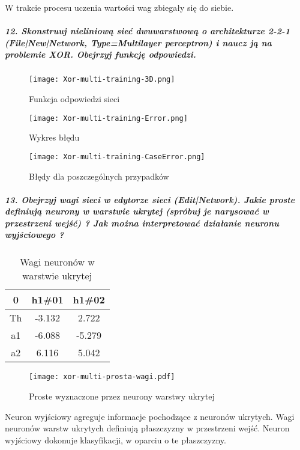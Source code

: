 \documentclass{article}
\begin{document}
W trakcie procesu uczenia wartości wag zbiegały się do siebie. 

\subparagraph{12. Skonstruuj nieliniową sieć dwuwarstwową o architekturze 2-2-1 (File|New|Network, Type=Multilayer perceptron) i naucz ją na problemie XOR. Obejrzyj funkcję odpowiedzi.\\}

\begin{figure}[H]
\begin{center}
\texttt{[image: Xor-multi-training-3D.png]}
\end{center}
\caption{Funkcja odpowiedzi sieci}
\label{fig-1Tdelta}
\end{figure}

\begin{figure}[H]
\begin{center}
\texttt{[image: Xor-multi-training-Error.png]}
\end{center}
\caption{Wykres błędu}
\label{fig-1Tdelta}
\end{figure}

\begin{figure}[H]
\begin{center}
\texttt{[image: Xor-multi-training-CaseError.png]}
\end{center}
\caption{Błędy dla poszczególnych przypadków}
\label{fig-1Tdelta}
\end{figure}

\subparagraph{13. Obejrzyj wagi sieci w edytorze sieci (Edit|Network). Jakie proste definiują neurony w warstwie ukrytej (spróbuj je narysować w przestrzeni wejść) ? Jak można interpretować działanie neuronu wyjściowego ?\\}
\begin{table}[h]
    \begin{tabular}{|c|c|c|}
     \hline
        0 & h1\#01 &	h1\#02 \\ \hline 
        Th & -3.132	& 2.722 \\ 
		a1 & -6.088	& -5.279 \\ 
		a2 & 6.116 & 5.042 \\ \hline             
    \end{tabular}
    \caption{Wagi neuronów w warstwie ukrytej}
\end{table} 

\begin{figure}[H]
\begin{center}
\texttt{[image: xor-multi-prosta-wagi.pdf]}
\end{center}
\caption{Proste wyznaczone przez neurony warstwy ukrytej}
\label{fig-1Tdelta}
\end{figure}
Neuron wyjściowy agreguje informacje pochodzące z neuronów ukrytych. Wagi neuronów warstw ukrytych definiują płaszczyzny w przestrzeni wejść. Neuron wyjściowy dokonuje klasyfikacji, w oparciu o te płaszczyzny.   
\end{document}
